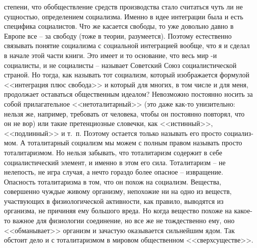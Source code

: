 \documentclass{book}
\begin{document}
степени, что обобществле­ние средств производства стало считаться чуть ли не сущностью, определением социализма. Именно в идее интеграции была и есть специфика социалистов. Что же касается свободы, то уже довольно давно в Европе все -- за свободу (тоже в теории, разумеется). Поэтому естественно связывать понятие социализма с социальной интеграцией вообще, что я и сделал в нача­ле этой части книги. Это имеет и то основание, что весь мир -и социалисты, и не социалисты -- называет Советский Союз социалистической страной. Но тогда, как называть тот социа­лизм, который изображается формулой <<интеграция плюс сво­бода>> и который для многих, в том числе и для меня, продол­жает оставаться общественным идеалом? Невозможно постоян­но носить за собой прилагательное <<нетоталитарный>> (это да­же как-то унизительно: нельзя же, например, требовать от че­ловека, чтобы он постоянно повторял, что он не вор) или та­кие претенциозные словечки, как <<истинный>>, <<подлинный>> и т.~п. Поэтому остается только называть его просто 
социализ­мом. А тоталитарный социализм мы можем с полным правом называть просто тоталитаризмом. Но нельзя забывать, что тоталитаризм содержит в себе социалистический элемент, и именно в этом его сила. Тоталитаризм -- не нелепость, не игра случая, а нечто гораздо более опасное -- извращение. Опасность тоталитаризма в том, что он похож на социализм.  Вещества, совершенно чуждые живому организму, непохожие ни на одно из веществ, участвующих в физиологической активности, как правило, выводятся из организма, не причиняя ему большого вреда. Но когда вещество похоже на какое-то важное для фи­зиологии соединение, но все же не тождественно ему, оно <<об­манывает>> организм и зачастую оказывается сильнейшим ядом. Так обстоит дело и с тоталитаризмом в мировом общественном <<сверхсуществе>>.
\end{document}

